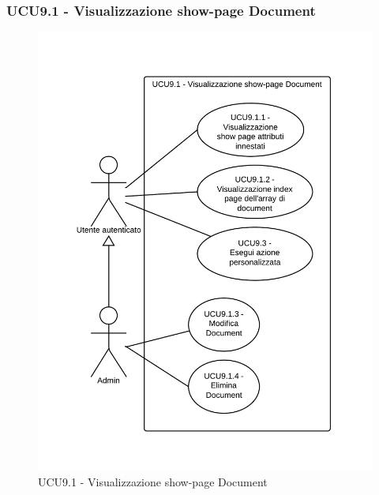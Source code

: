 \subsubsection{UCU9.1 - Visualizzazione show-page Document} 
    \begin{figure}[H]
      \includegraphics[width=12cm]{UML/UCU9.1 - Visualizzazione show-page Document.png}
      \caption{UCU9.1 - Visualizzazione show-page Document} 
    \end{figure}
    

